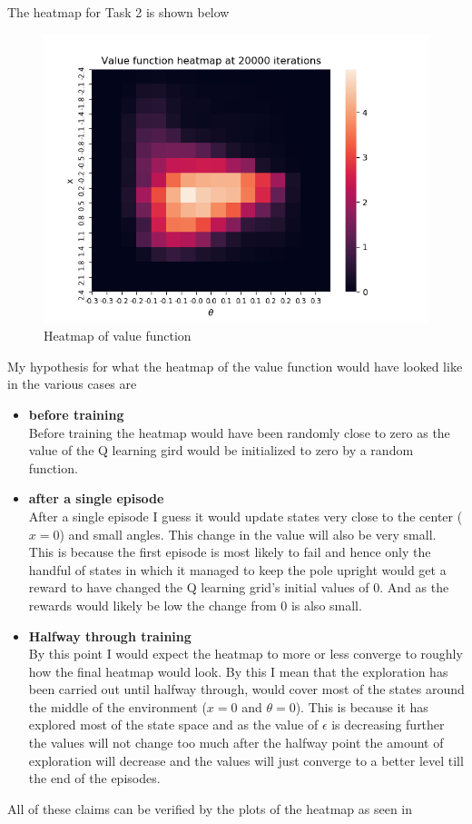 \documentclass[a4paper]{article}
\begin{document}
The heatmap for Task 2 is shown below
\begin{figure}[h!]
    \centering
    \includegraphics[width=\textwidth]{heatmap_done.png}
    \caption{Heatmap of value function}
    \label{fig-heatmap-done}
\end{figure}

\noindent
My hypothesis for what the heatmap of the value function would have looked like in the various cases are
\begin{itemize}
    \item \textbf{before training} \\ 
    Before training the heatmap would have been randomly close to zero as the value of the Q learning gird would be initialized to zero by a random function.
    \item \textbf{after a single episode}\\
    After a single episode I guess it would update states very close to the center ($x=0$) and small angles. This change in the value will also be very small. This is because the first episode is most likely to fail and hence only the handful of states in which it managed to keep the pole upright would get a reward to have changed the Q learning grid's initial values of 0. And as the rewards would likely be low the change from 0 is also small.
    \item \textbf{Halfway through training}\\
    By this point I would expect the heatmap to more or less converge to roughly how the final heatmap would look. By this I mean that the exploration has been carried out until halfway through, would cover most of the states around the middle of the environment ($x=0$ and $\theta =0$). This is because it has explored most of the state space and as the value of $\epsilon$ is decreasing further the values will not change too much after the halfway point the amount of exploration will decrease and the values will just converge to a better level till the end of the episodes.
\end{itemize}
All of these claims can be verified by the plots of the heatmap as seen in 
\end{document}
